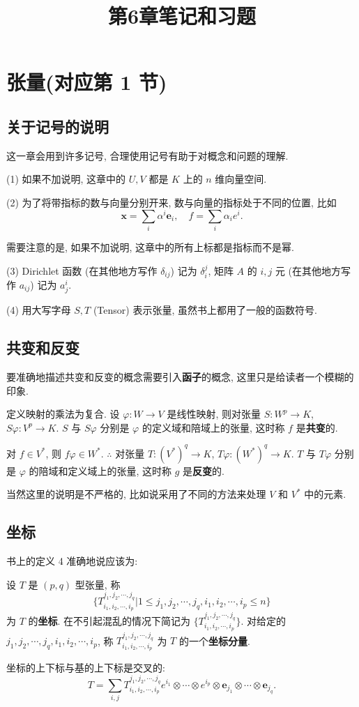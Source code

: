\documentclass{ctexart}
\title{第6章笔记和习题}
\begin{document}
\maketitle
\section{张量(对应第 1 节)}
\subsection{关于记号的说明}
这一章会用到许多记号, 合理使用记号有助于对概念和问题的理解.

(1) 如果不加说明, 这章中的 $U,V$ 都是 $K$ 上的 $n$ 维向量空间.

(2) 为了将带指标的数与向量分别开来, 数与向量的指标处于不同的位置, 比如
\[\boldsymbol{x}=\sum\limits_i\alpha^i\boldsymbol{e}_i,\quad f=\sum\limits_i\alpha_ie^i.\]

需要注意的是, 如果不加说明, 这章中的所有上标都是指标而不是幂.

(3) Dirichlet 函数 (在其他地方写作 $\delta_{ij}$) 记为 $\delta_i^j$, 矩阵 $A$ 的 $i,j$ 元 (在其他地方写作 $a_{ij}$) 记为 $a_j^i$.

(4) 用大写字母 $S,T$ (Tensor) 表示张量, 虽然书上都用了一般的函数符号.
\subsection{共变和反变}
要准确地描述共变和反变的概念需要引入\textbf{函子}的概念, 这里只是给读者一个模糊的印象.

定义映射的乘法为复合. 设 $\varphi:W\to V$ 是线性映射, 则对张量 $S:W^p\to K$, $S\varphi:V^p\to K$. $S$ 与 $S\varphi$ 分别是 $\varphi$ 的定义域和陪域上的张量, 这时称 $f$ 是\textbf{共变}的.

对 $f\in V^*$, 则 $f\varphi\in W^*$. $\therefore$ 对张量 $T:(V^*)^q\to K$, $T\varphi:(W^*)^q\to K$. $T$ 与 $T\varphi$ 分别是 $\varphi$ 的陪域和定义域上的张量, 这时称 $g$ 是\textbf{反变}的.

当然这里的说明是不严格的, 比如说采用了不同的方法来处理 $V$ 和 $V^*$ 中的元素.
\subsection{坐标}
书上的定义 4 准确地说应该为:
\begin{definition}
    设 $T$ 是 $(p,q)$ 型张量, 称
    \[\{T^{j_1,j_2,\cdots,j_q}_{i_1,i_2,\cdots,i_p}|1\leq j_1,j_2,\cdots,j_q,i_1,i_2,\cdots,i_p\leq n\}\]
    为 $T$ 的\textbf{坐标}. 在不引起混乱的情况下简记为 $\{T^{j_1,j_2,\cdots,j_q}_{i_1,i_2,\cdots,i_p}\}$. 对给定的 $j_1,j_2,\cdots,j_q,i_1,i_2,\cdots,i_p$, 称 $T^{j_1,j_2,\cdots,j_q}_{i_1,i_2,\cdots,i_p}$ 为 $T$ 的一个\textbf{坐标分量}.
\end{definition}
坐标的上下标与基的上下标是交叉的:
\[T=\sum\limits_{i,j}T^{j_1,j_2,\cdots,j_q}_{i_1,i_2,\cdots,i_p}e^{i_1}\otimes\cdots\otimes e^{i_p}\otimes\boldsymbol{e}_{j_1}\otimes\cdots\otimes\boldsymbol{e}_{j_q}.\]
\end{document}

